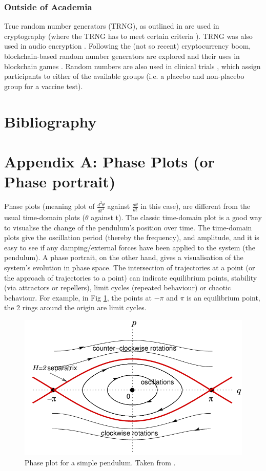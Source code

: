 \documentclass[10pt, twocolumn]{article}
\begin{document}
\subsubsection{Outside of Academia} %
True random number generators (TRNG), as outlined in \cite{Sunar2009} are used in cryptography (where the TRNG has to meet certain criteria \cite{Latham2001}). TRNG was also used in audio encryption \cite{Etem2020}. Following the (not so recent) cryptocurrency boom, blockchain-based random number generators \cite{Hsieh2022} are explored and their uses in blockchain games \cite{Du2019}. Random numbers are also used in clinical trials \cite{Beller2002}, which assign participants to either of the available groups (i.e. a placebo and non-placebo group for a vaccine test).

\newpage
\section{Bibliography}



\onecolumn
\newpage
\section{Appendix A: Phase Plots (or Phase portrait)} \label{phase plots appendix}
Phase plots (meaning plot of $\frac{d^2\theta}{dt^2}$ against $\frac{d\theta}{dt}$ in this case), are different from the usual time-domain plots ($\theta$ against t). The classic time-domain plot is a good way to visualise the change of the pendulum's position over time. The time-domain plots give the oscillation period (thereby the frequency), and amplitude, and it is easy to see if any damping/external forces have been applied to the system (the pendulum). A phase portrait, on the other hand, gives a visualisation of the system's evolution in phase space. The intersection of trajectories at a point (or the approach of trajectories to a point) can indicate equilibrium points, stability (via attractors or repellers), limit cycles (repeated behaviour) or chaotic behaviour. For example, in Fig \ref{ballholmes}, the points at $-\pi$ and $\pi$ is an equilibrium point, the 2 rings around the origin are limit cycles.
\begin{figure}[H]
    \centering
    \includegraphics[width = 0.5\columnwidth]{Projects/ForcedSimplePendulum/WrittenReport/figs/The-phase-space-of-the-simple-pendulum.png}
    \caption{Phase plot for a simple pendulum. Taken from \cite{Ball2007}.}
    \label{ballholmes}
\end{figure}
\end{document}
